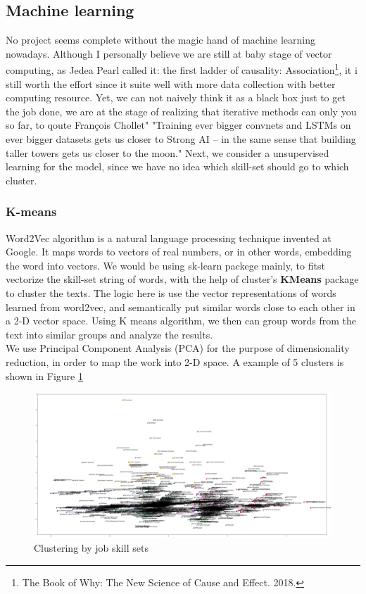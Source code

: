 \subsection{Machine learning}
No project seems complete without the magic hand of machine learning nowadays. Although I personally believe we are still at baby stage of vector computing, as Jedea Pearl called it: the first ladder of causality: Association\footnote{The Book of Why: The New Science of Cause and Effect. 2018.}, it i still worth the effort since it suite well with more data collection with better computing resource. Yet, we can not naively think it as a black box just to get the job done, we are at the stage of realizing that iterative methods can only you so far, to qoute François Chollet" "Training ever bigger convnets and LSTMs on ever bigger datasets gets us closer to Strong AI -- in the same sense that building taller towers gets us closer to the moon." Next, we consider a unsupervised learning for the model, since we have no idea which skill-set should go to which cluster.
\subsubsection{K-means}
Word2Vec algorithm is a natural language processing technique invented at Google. It maps words to vectors of real numbers, or in other words, embedding the word into vectors. We would be using sk-learn packege mainly, to fitst vectorize the skill-set string of words, with the help of cluster's \textbf{KMeans} package to cluster the texts. The logic here is use the vector representations of words learned from word2vec, and semantically put similar words close to each other in a 2-D vector space. Using K means algorithm, we then can group words from the text into similar groups and analyze the results.\\
We  use Principal Component Analysis (PCA) for the purpose of  dimensionality reduction, in order to map the work into 2-D space. A example of 5 clusters is shown in Figure \ref{pca} 
\begin{figure}[h]
	\begin{center}
		\includegraphics[width=.9\linewidth]{./photos/clusterscatter.png}
	\end{center}
	\caption{Clustering by job skill sets}
	\label{pca}
\end{figure}

